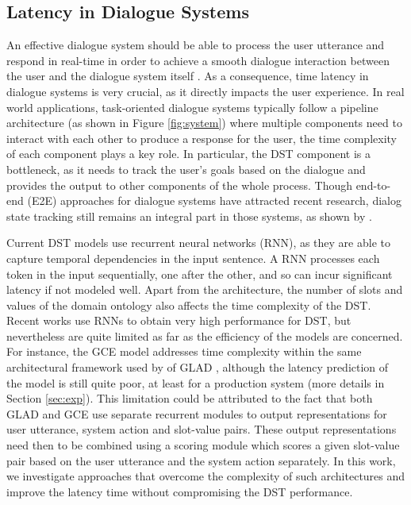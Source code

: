 \documentclass{article}
\begin{document}
\subsection{Latency in Dialogue Systems}
An effective dialogue system should be able to process the user utterance and respond in real-time in order to achieve a smooth dialogue interaction between the user and the dialogue system itself \cite{nakano1999, challenges}. As a consequence, time latency in dialogue systems is very crucial, as it directly impacts the user experience.
In real world applications, task-oriented dialogue systems typically follow a pipeline architecture (as shown in Figure \ref{fig:system})
where multiple components need to interact with each other to produce a response for the user, the time complexity of each component plays a key role.
In particular, the DST component is a bottleneck, as it needs to track the user's goals based on the dialogue and provides the output to other components of the whole process.
Though end-to-end (E2E) approaches for dialogue systems have attracted recent research, dialog state tracking still remains an integral part in those systems, as shown by \cite{Liu2017, Wen2017, Li2017}.

Current DST models use recurrent neural networks (RNN), as they are able to capture temporal dependencies in the input sentence.
A RNN processes each token in the input sequentially, one after the other, and so can incur significant latency if not modeled well.
Apart from the architecture, the number of slots and values of the domain ontology also affects the time complexity of the DST.
Recent works \cite{NBT, GLAD, Ren2018} use RNNs to obtain very high performance for DST, but nevertheless are quite limited as far as the efficiency of the models are concerned.
For instance, the GCE model \cite{GCE} addresses time complexity within the same architectural framework used by of GLAD \cite{GLAD}, although the latency prediction of the model is still quite poor, at least for a production system (more details in Section \ref{sec:exp}).
This limitation could be attributed to the fact that both GLAD and GCE use separate recurrent modules to output representations for user utterance, system action and slot-value pairs.
These output representations need then to be combined using a scoring module which scores a given slot-value pair based on the user utterance and the system action separately.
In this work, we investigate approaches that overcome the complexity of such architectures and improve the latency time without compromising the DST performance.
\end{document}
